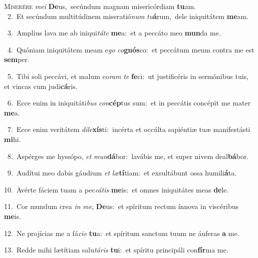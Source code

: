 \lettrine{\initial\textcolor{\initialcolor}{M}}{iserére} \textit{me}\-\textit{i} \textbf{De}\-us,~\star secúndum magnam misericórdiam \textbf{tu}\-am.\\
{\numbfont\textcolor{\numbcolor}{~2.}}~Et secúndum multitúdinem miseratió\textit{num} \textit{tu}\-\textbf{á}rum,~\star dele iniquitátem \textbf{me}\-am.\par
{\numbfont\textcolor{\numbcolor}{~3.}}~Amplius lava me ab iniqui\-\textit{tá}\-\textit{te} \textbf{me}\-a:~\star et a peccáto meo \textbf{mun}\-da me.\par
{\numbfont\textcolor{\numbcolor}{~4.}}~Quóniam iniquitátem meam e\textit{go} \textit{co}\-\textbf{gnós}co:~\star et peccátum meum contra me est \textbf{sem}\-per.\par
{\numbfont\textcolor{\numbcolor}{~5.}}~Tibi soli peccávi, et malum co\textit{ram} \textit{te} \textbf{fe}\-ci:~\star ut justificéris in sermónibus tuis, et vincas cum judi\-\textbf{cá}\-ris.\par
{\numbfont\textcolor{\numbcolor}{~6.}}~Ecce enim in iniquitáti\textit{bus} \textit{con}\-\textbf{cép}tus sum:~\star et in peccátis concépit me mater \textbf{me}\-a.\par
{\numbfont\textcolor{\numbcolor}{~7.}}~Ecce enim veritátem \textit{di}\-\textit{le}\textbf{xís}ti:~\star incérta et occúlta sapiéntiæ tuæ manifestásti \textbf{mi}\-hi.\par
{\numbfont\textcolor{\numbcolor}{~8.}}~Aspérges me hyssópo, \textit{et} \textit{mun}\-\textbf{dá}bor:~\star lavábis me, et super nivem deal\-\textbf{bá}\-bor.\par
{\numbfont\textcolor{\numbcolor}{~9.}}~Audítui meo dabis gáudium \textit{et} \textit{læ}\-\textbf{tí}tiam:~\star et exsultábunt ossa humili\-\textbf{á}\-ta.\par
{\numbfont\textcolor{\numbcolor}{10.}}~Avérte fáciem tuam a pec\-\textit{cá}\-\textit{tis} \textbf{me}\-is:~\star et omnes iniquitátes meas \textbf{de}\-le.\par
{\numbfont\textcolor{\numbcolor}{11.}}~Cor mundum crea \textit{in} \textit{me}\-, \textbf{De}\-us:~\star et spíritum rectum ínnova in viscéribus \textbf{me}\-is.\par
{\numbfont\textcolor{\numbcolor}{12.}}~Ne projícias me a fá\-\textit{ci}\-\textit{e} \textbf{tu}\-a:~\star et spíritum sanctum tuum ne áuferas \textbf{a} me.\par
{\numbfont\textcolor{\numbcolor}{13.}}~Redde mihi lætítiam salu\-\textit{tá}\-\textit{ris} \textbf{tu}\-i:~\star et spíritu principáli con\-\textbf{fír}\-ma me.\par
